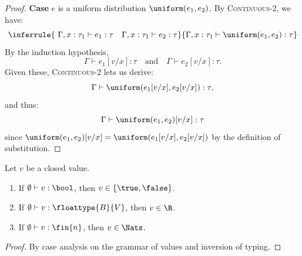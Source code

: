\begin{proof}
	\textbf{Case} $e$ is a uniform distribution $\uniform(e_1,e_2)$. By \textsc{Continuous-2}, we have:
	\[
		\inferrule
		{\ \Gamma, x : \tau_1 \vdash e_1 : \tau \quad \Gamma, x : \tau_1 \vdash e_2 : \tau}
		{\Gamma, x : \tau_1 \vdash \uniform(e_1,e_2) : \tau}
	\]
	By the induction hypothesis,
	\[
		\Gamma \vdash e_1[v/x] : \tau
		\quad\text{and}\quad
		\Gamma \vdash e_2[v/x] : \tau.
	\]
	Given these, \textsc{Continuous-2} lets us derive:
	\[
		\Gamma \vdash \uniform(e_1[v/x], e_2[v/x]) : \tau,
	\]
	and thus:
	\[
		\Gamma \vdash \uniform(e_1,e_2)[v/x] : \tau
	\]
	since $\uniform(e_1,e_2)[v/x] = \uniform(e_1[v/x], e_2[v/x])$ by the definition of substitution.
\end{proof}

\begin{lemma}\label{lem:canonical-forms}
	Let $v$ be a closed value. 
	\begin{enumerate}
		\item If $\emptyset \vdash v : \bool$, then $v \in \{\true, \false\}$.
		\item If $\emptyset \vdash v : \floattype{B}{V}$, then $v \in \R$.
		\item If $\emptyset \vdash v : \fin{n}$, then $v \in \Nats$.
	\end{enumerate}
\end{lemma}

\begin{proof}
	By case analysis on the grammar of values and inversion of typing.
\end{proof}

